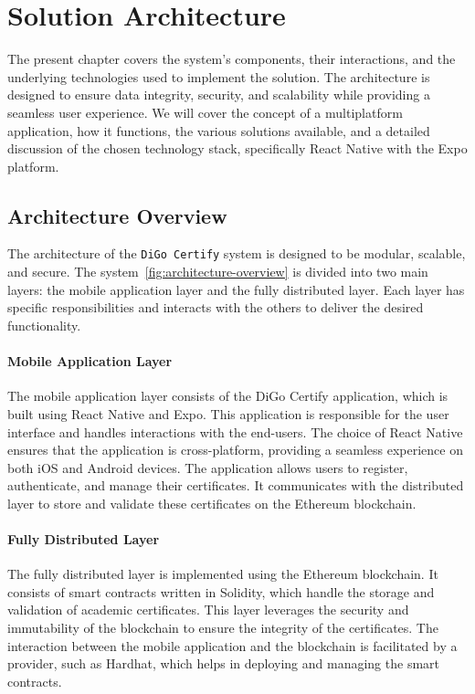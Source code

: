 %
%
\chapter{Solution Architecture}\label{chap:architecture}

The present chapter covers the system's components, their interactions, and the underlying technologies used to implement the solution. The architecture is designed to ensure data integrity, security, and scalability while providing a seamless user experience. We will cover the concept of a multiplatform application, how it functions, the various solutions available, and a detailed discussion of the chosen technology stack, specifically React Native with the Expo\cite{Expo} platform.

\section{Architecture Overview}\label{sec:architecture-overview}

The architecture of the \texttt{DiGo Certify} system is designed to be modular, scalable, and secure. The system~\ref{fig:architecture-overview} is divided into two main layers: the mobile application layer and the fully distributed layer. Each layer has specific responsibilities and interacts with the others to deliver the desired functionality.

\subsubsection{Mobile Application Layer}

The mobile application layer consists of the DiGo Certify application, which is built using React Native and Expo. This application is responsible for the user interface and handles interactions with the end-users. The choice of React Native ensures that the application is cross-platform, providing a seamless experience on both iOS and Android devices. The application allows users to register, authenticate, and manage their certificates. It communicates with the distributed layer to store and validate these certificates on the Ethereum blockchain.

\subsubsection{Fully Distributed Layer}

The fully distributed layer is implemented using the Ethereum blockchain. It consists of smart contracts written in Solidity, which handle the storage and validation of academic certificates. This layer leverages the security and immutability of the blockchain to ensure the integrity of the certificates. The interaction between the mobile application and the blockchain is facilitated by a provider, such as Hardhat, which helps in deploying and managing the smart contracts.

